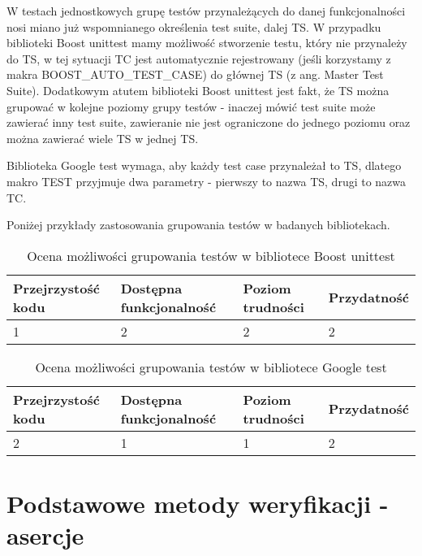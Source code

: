 \documentclass[12pt,a4paper,notitlepage]{report}
\begin{document}
W testach jednostkowych grupę testów przynależących do danej funkcjonalności nosi miano już wspomnianego określenia test suite, dalej TS. 
W przypadku biblioteki Boost unittest mamy możliwość stworzenie testu, który nie przynależy do TS, w tej sytuacji TC jest automatycznie rejestrowany (jeśli korzystamy z makra BOOST{\_}AUTO{\_}TEST{\_}CASE) do głównej TS (z ang. Master Test Suite).
Dodatkowym atutem biblioteki Boost unittest jest fakt, że TS można grupować w kolejne poziomy grupy testów - inaczej mówić test suite może zawierać inny test suite, zawieranie nie jest ograniczone do jednego poziomu oraz można zawierać wiele TS w jednej TS.

Biblioteka Google test wymaga, aby każdy test case przynależał to TS, dlatego makro TEST przyjmuje dwa parametry - pierwszy to nazwa TS, drugi to nazwa TC.

Poniżej przykłady zastosowania grupowania testów w badanych bibliotekach.

\begin{center}
			\begin{table}[!ht]
			\caption{Ocena możliwości grupowania testów w bibliotece Boost unittest}
			\label{}
			\begin{tabular}[!hc]{|l|l|l|l|}
		\hline
		Przejrzystość kodu 	&	Dostępna funkcjonalność	&	Poziom trudności	&	Przydatność \\ \hline
		1					&	2						&	2					& 	2  			\\ \hline
			\end{tabular}
			\end{table} 
		\end{center}

\begin{center}
			\begin{table}[!ht]
			\caption{Ocena możliwości grupowania testów w bibliotece Google test}
			\label{}
			\begin{tabular}[!hc]{|l|l|l|l|}
		\hline
		Przejrzystość kodu 	&	Dostępna funkcjonalność	&	Poziom trudności	&	Przydatność \\ \hline
		2					&	1						&	1					& 	2  			\\ \hline
			\end{tabular}
			\end{table} 
		\end{center}

\chapter{Podstawowe metody weryfikacji - asercje}
\end{document}
